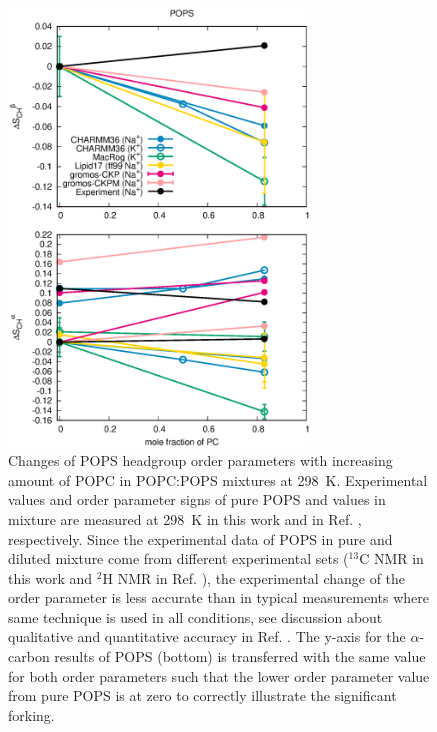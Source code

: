 \documentclass[aps,prl,superscriptaddress,twocolumn]{revtex4}
\begin{document}
\begin{figure}[!htb]
  \centering
  \includegraphics[width=8.0cm]{../Figs/HGorderparametersPSvsPC.eps}
  \caption{\label{HGorderparametersPSvsPC}
    Changes of POPS headgroup order parameters with increasing amount of POPC in POPC:POPS mixtures at 298~K.
    Experimental values and order parameter signs of pure POPS and values in mixture are  
    measured at 298~K in this work and in Ref. , respectively.
    Since the experimental data of POPS in pure and diluted mixture come from
    different experimental sets ($^{13}$C NMR in this work and $^{2}$H NMR in Ref. ),
    the experimental change of the order parameter is less accurate than in typical measurements
    where same technique is used in all conditions, see discussion about qualitative and quantitative 
    accuracy in Ref. .
    The y-axis for the $\alpha$-carbon results of POPS (bottom) is transferred
    with the same value for both order parameters such that the lower order
    parameter value from pure POPS is at zero to correctly illustrate the significant forking.
  }
\end{figure}
\end{document}
